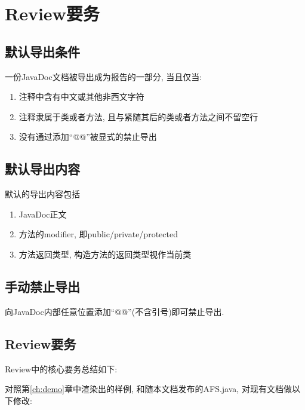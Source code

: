 \chapter{Review要务}
\label{ch:review}

\section{默认导出条件}

一份JavaDoc文档被导出成为报告的一部分, 当且仅当:

\begin{centering}
    \begin{enumerate}
        \item 注释中含有中文或其他非西文字符
        \item 注释隶属于类或者方法, 且与紧随其后的类或者方法之间不留空行
        \item 没有通过添加``@@''被显式的禁止导出
    \end{enumerate}
\end{centering}

\section{默认导出内容}

默认的导出内容包括

\begin{centering}
    \begin{enumerate}
        \item JavaDoc正文
        \item 方法的modifier, 即public/private/protected
        \item 方法返回类型, 构造方法的返回类型视作当前类
    \end{enumerate}
\end{centering}

\section{手动禁止导出}

向JavaDoc内部任意位置添加``@@''(不含引号)即可禁止导出.

\section{Review要务}

Review中的核心要务总结如下:

对照第\ref{ch:demo}章中渲染出的样例, 和随本文档发布的AFS.java,
对现有文档做以下修改:


